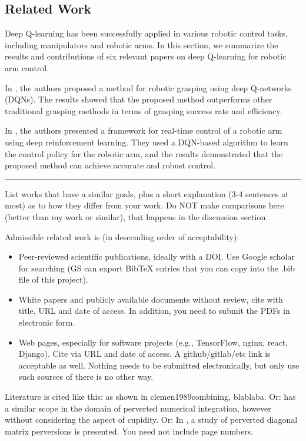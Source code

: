 \documentclass[12pt,oneside]{article}
\begin{document}
\subsection{Related Work}
Deep Q-learning has been successfully applied in various robotic control tasks, including manipulators and robotic arms. In this section, we summarize the results and contributions of six relevant papers on deep Q-learning for robotic arm control.

In \cite{LevinePastorKrizhevsky}, the authors proposed a method for robotic grasping using deep Q-networks (DQNs). The results showed that the proposed method outperforms other traditional grasping methods in terms of grasping success rate and efficiency.

In \cite{GuShixiangHolly}, the authors presented a framework for real-time control of a robotic arm using deep reinforcement learning. They used a DQN-based algorithm to learn the control policy for the robotic arm, and the results demonstrated that the proposed method can achieve accurate and robust control.


\par\noindent\rule{\textwidth}{0.4pt}


List works that have a similar goals, plus a short explanation (3-4 sentences at most) as to how they differ from your work. Do NOT make comparisons here (better than my work or similar), that happens in the discussion section.

Admissible related work is (in descending order of acceptability):
\begin{itemize}
\item Peer-reviewed scientific publications, ideally with a DOI. Use Google scholar for searching (GS can export BibTeX entries that you can copy into the .bib file of this project). 

\item White papers and publicly available documents without review, cite with title, URL and date of access. In addition, you need to submit the PDFs in electronic form.

\item Web pages, especially for software projects (e.g., TensorFlow, nginx, react, Django). Cite via URL and date of access. A github/gitlab/etc link is acceptable as well. Nothing needs to be submitted electronically, but only use such sources of there is no other way. 
\end{itemize}

Literature is cited like this: as shown in {clemen1989combining}, blablaba. Or: \cite{clemen1989combining} has a similar scope in the domain of perverted numerical integration, however without considering the aspect of cupidity. Or: In \cite{clemen1989combining}, a study of perverted diagonal matrix perversions is presented. You need not include page numbers.
\end{document}
